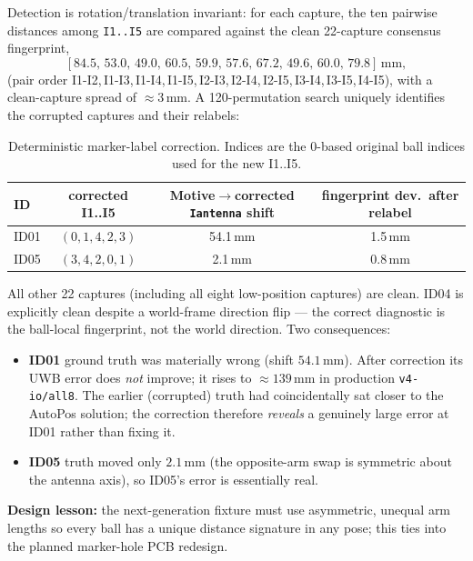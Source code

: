 \documentclass[11pt,a4paper]{article}
\newcommand{\mm}{\,\si{\milli\meter}}
\begin{document}
Detection is rotation/translation invariant: for each capture, the ten pairwise distances
among \texttt{I1..I5} are compared against the clean 22-capture consensus fingerprint,
\[
[84.5,\,53.0,\,49.0,\,60.5,\,59.9,\,57.6,\,67.2,\,49.6,\,60.0,\,79.8]\mm,
\]
(pair order I1-I2,\,I1-I3,\,I1-I4,\,I1-I5,\,I2-I3,\,I2-I4,\,I2-I5,\,I3-I4,\,I3-I5,\,I4-I5),
with a clean-capture spread of $\approx\!3\mm$. A 120-permutation search uniquely identifies
the corrupted captures and their relabels:

\begin{table}[h]
\centering
\caption{Deterministic marker-label correction. Indices are the 0-based original ball
indices used for the new I1..I5.}
\begin{tabular}{lccc}
\toprule
ID & corrected I1..I5 & Motive$\to$corrected \texttt{Iantenna} shift & fingerprint dev.\ after relabel \\
\midrule
ID01 & $(0,1,4,2,3)$ & 54.1\mm & 1.5\mm \\
ID05 & $(3,4,2,0,1)$ & 2.1\mm  & 0.8\mm \\
\bottomrule
\end{tabular}
\end{table}

\noindent
All other 22 captures (including all eight low-position captures) are clean. ID04 is
explicitly clean despite a world-frame direction flip --- the correct diagnostic is the
ball-local fingerprint, not the world direction. Two consequences:
\begin{itemize}[leftmargin=1.4em]
  \item \textbf{ID01} ground truth was materially wrong (shift $54.1\mm$). After correction
        its UWB error does \emph{not} improve; it rises to $\approx\!139\mm$ in production
        \texttt{v4-io/all8}. The earlier (corrupted) truth had coincidentally sat closer to
        the AutoPos solution; the correction therefore \emph{reveals} a genuinely large
        error at ID01 rather than fixing it.
  \item \textbf{ID05} truth moved only $2.1\mm$ (the opposite-arm swap is symmetric about the
        antenna axis), so ID05's error is essentially real.
\end{itemize}
\textbf{Design lesson:} the next-generation fixture must use asymmetric, unequal arm lengths
so every ball has a unique distance signature in any pose; this ties into the planned
marker-hole PCB redesign.
\end{document}
